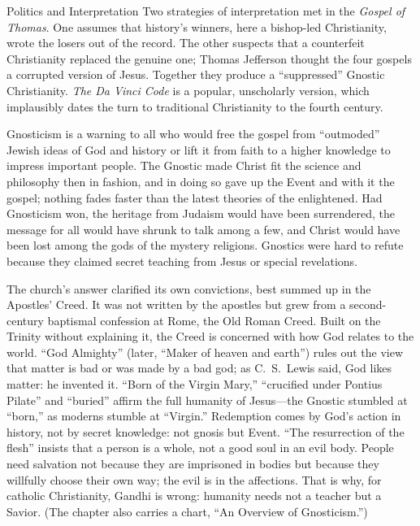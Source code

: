 \begin{sidebox}{Politics and Interpretation}
Two strategies of interpretation met in the \emph{Gospel of Thomas}. One assumes that history's
winners, here a bishop-led Christianity, wrote the losers out of the record. The other suspects that
a counterfeit Christianity replaced the genuine one; Thomas Jefferson thought the four gospels a
corrupted version of Jesus. Together they produce a ``suppressed'' Gnostic Christianity.
\emph{The Da Vinci Code} is a popular, unscholarly version, which implausibly dates the turn to
traditional Christianity to the fourth century.
\end{sidebox}

Gnosticism is a warning to all who would free the gospel from ``outmoded'' Jewish ideas of God and
history or lift it from faith to a higher knowledge to impress important people. The Gnostic made Christ fit the science and philosophy then in fashion, and in doing so gave up the Event and with it the gospel; nothing fades
faster than the latest theories of the enlightened. Had Gnosticism won, the heritage from Judaism
would have been surrendered, the message for all would have shrunk to talk among a few, and Christ
would have been lost among the gods of the mystery religions. Gnostics were hard to refute because
they claimed secret teaching from Jesus or special revelations.

The church's answer clarified its own convictions, best summed up in the Apostles' Creed. It was not
written by the apostles but grew from a second-century baptismal confession at Rome, the Old Roman
Creed. Built on the Trinity without explaining it, the Creed is concerned with how God relates to the
world. ``God Almighty'' (later, ``Maker of heaven and earth'') rules out the view that matter is bad or was made by a bad god; as C.~S.~Lewis said, God likes matter: he invented it. ``Born of the
Virgin Mary,'' ``crucified under Pontius Pilate'' and ``buried'' affirm the full humanity of
Jesus---the Gnostic stumbled at ``born,'' as moderns stumble at ``Virgin.'' Redemption comes by
God's action in history, not by secret knowledge: not gnosis but Event. ``The resurrection of the
flesh'' insists that a person is a whole, not a good soul in an evil body. People need salvation not
because they are imprisoned in bodies but because they willfully choose their own way; the evil is in
the affections. That is why, for catholic Christianity, Gandhi is wrong: humanity needs not a teacher
but a Savior. (The chapter also carries a chart, ``An Overview of Gnosticism.'')

